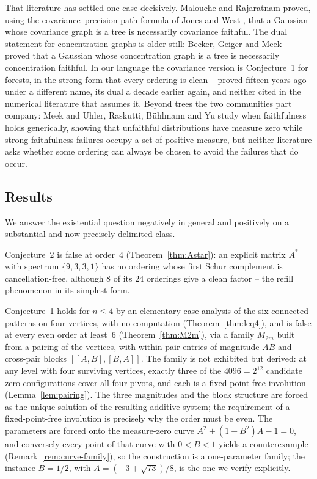 \documentclass[11pt]{article}
\theoremstyle{plain}
\theoremstyle{definition}
\begin{document}
\begin{humanblock}
That literature has settled one case decisively. Malouche and Rajaratnam \cite{Malouche} proved, using the covariance--precision path formula of Jones and West \cite{Jones}, that a Gaussian whose covariance graph is a tree is necessarily covariance faithful. The dual statement for concentration graphs is older still: Becker, Geiger and Meek~\cite{Becker} proved that a Gaussian whose concentration graph is a tree is necessarily concentration faithful. In our language the covariance version is Conjecture~1 for forests, in the strong form that every ordering is clean -- proved fifteen years ago under a different name, its dual a decade earlier again, and neither cited in the numerical literature that assumes it. Beyond trees the two communities part company: Meek \cite{Meek} and Uhler, Raskutti, B\"uhlmann and Yu \cite{Uhler} study when faithfulness holds generically, showing that unfaithful distributions have measure zero while strong-faithfulness failures occupy a set of positive measure, but neither literature asks whether some ordering can always be chosen to avoid the failures that do occur.

\subsection{Results}

We answer the existential question negatively in general and positively on a substantial and now precisely delimited class.

Conjecture~2 is false at order~4 (Theorem~\ref{thm:Astar}): an explicit matrix $A^*$ with spectrum $\{9,3,3,1\}$ has no ordering whose first Schur complement is cancellation-free, although $8$ of its $24$ orderings give a clean factor -- the refill phenomenon in its simplest form.

Conjecture~1 holds for $n\le4$ by an elementary case analysis of the six connected patterns on four vertices, with no computation (Theorem~\ref{thm:leq4}), and is false at every even order at least~6 (Theorem~\ref{thm:M2m}), via a family $M_{2m}$ built from a pairing of the vertices, with within-pair entries of magnitude $AB$ and cross-pair blocks $[[A,B],[B,A]]$. The family is not exhibited but derived: at any level with four surviving vertices, exactly three of the $4096=2^{12}$ candidate zero-configurations cover all four pivots, and each is a fixed-point-free involution (Lemma~\ref{lem:pairing}). The three magnitudes and the block structure are forced as the unique solution of the resulting additive system; the requirement of a fixed-point-free involution is precisely why the order must be even. The parameters are forced onto the measure-zero curve $A^2+(1-B^2)A-1=0$, and conversely every point of that curve with $0<B<1$ yields a counterexample (Remark~\ref{rem:curve-family}), so the construction is a one-parameter family; the instance $B=1/2$, with $A=(-3+\sqrt{73})/8$, is the one we verify explicitly.


\end{humanblock}
\end{document}
